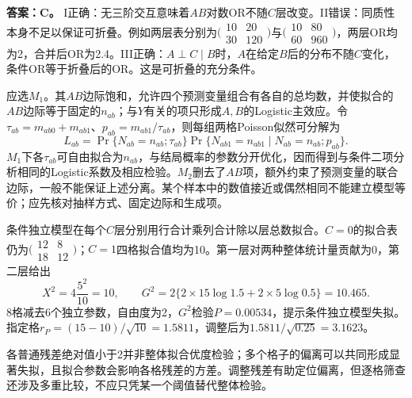 \textbf{答案：C。} I正确：无三阶交互意味着$AB$对数OR不随$C$层改变。II错误：同质性本身不足以保证可折叠。例如两层表分别为$\bigl(\begin{smallmatrix}10&20\\30&120\end{smallmatrix}\bigr)$与$\bigl(\begin{smallmatrix}10&80\\60&960\end{smallmatrix}\bigr)$，两层OR均为2，合并后OR为2.4。III正确：$A\perp C\mid B$时，$A$在给定$B$后的分布不随$C$变化，条件OR等于折叠后的OR。这是可折叠的充分条件。
\par\nobreak\smallskip{}

应选$M_1$。其$AB$边际饱和，允许四个预测变量组合有各自的总均数，并使拟合的$AB$边际等于固定的$n_{ab}$；与$Y$有关的项只形成$A,B$的Logistic主效应。令$\tau_{ab}=m_{ab0}+m_{ab1}$、$p_{ab}=m_{ab1}/\tau_{ab}$，则每组两格Poisson似然可分解为\[L_{ab}=\Pr\{N_{ab}=n_{ab};\tau_{ab}\}\Pr\{N_{ab1}=n_{ab1}\mid N_{ab}=n_{ab};p_{ab}\}.\]$M_1$下各$\tau_{ab}$可自由拟合为$n_{ab}$，与结局概率的参数分开优化，因而得到与条件二项分析相同的Logistic系数及相应检验。$M_2$删去了$AB$项，额外约束了预测变量的联合边际，一般不能保证上述分离。某个样本中的数值接近或偶然相同不能建立模型等价；应先核对抽样方式、固定边际和生成项。
\par\nobreak\smallskip{}

条件独立模型在每个$C$层分别用行合计乘列合计除以层总数拟合。$C=0$的拟合表仍为$\bigl(\begin{smallmatrix}12&8\\18&12\end{smallmatrix}\bigr)$；$C=1$四格拟合值均为10。第一层对两种整体统计量贡献为0，第二层给出\[X^2=4\frac{5^2}{10}=10,\qquad G^2=2\{2\times15\log1.5+2\times5\log0.5\}=10.465.\]8格减去6个独立参数，自由度为2，$G^2$检验$P=0.00534$，提示条件独立模型失拟。指定格$r_P=(15-10)/\sqrt{10}=1.5811$，调整后为$1.5811/\sqrt{0.25}=3.1623$。\par 各普通残差绝对值小于2并非整体拟合优度检验；多个格子的偏离可以共同形成显著失拟，且拟合参数会影响各格残差的方差。调整残差有助定位偏离，但逐格筛查还涉及多重比较，不应只凭某一个阈值替代整体检验。
\par\nobreak\smallskip{}

